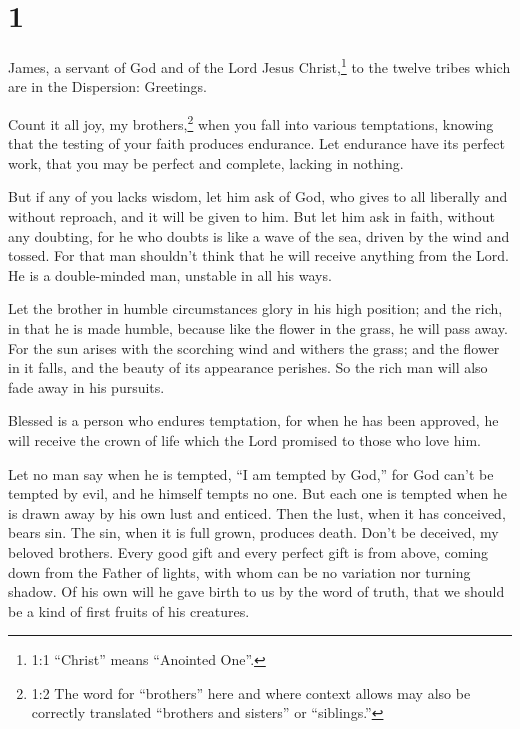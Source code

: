 \hypertarget{section}{%
\section{1}\label{section}}

 James, a servant of God and of the Lord Jesus
Christ,\footnote{1:1 ``Christ'' means ``Anointed One''.} to the twelve
tribes which are in the Dispersion: Greetings.

 Count it all joy, my brothers,\footnote{1:2 The word for
  ``brothers'' here and where context allows may also be correctly
  translated ``brothers and sisters'' or ``siblings.''} when you fall
into various temptations,  knowing that the testing of your
faith produces endurance.  Let endurance have its perfect
work, that you may be perfect and complete, lacking in nothing.

 But if any of you lacks wisdom, let him ask of God, who
gives to all liberally and without reproach, and it will be given to
him.  But let him ask in faith, without any doubting, for he
who doubts is like a wave of the sea, driven by the wind and tossed.
 For that man shouldn't think that he will receive anything
from the Lord.  He is a double-minded man, unstable in all
his ways.

 Let the brother in humble circumstances glory in his high
position;  and the rich, in that he is made humble, because
like the flower in the grass, he will pass away.  For the
sun arises with the scorching wind and withers the grass; and the flower
in it falls, and the beauty of its appearance perishes. So the rich man
will also fade away in his pursuits.

 Blessed is a person who endures temptation, for when he
has been approved, he will receive the crown of life which the Lord
promised to those who love him.

 Let no man say when he is tempted, ``I am tempted by
God,'' for God can't be tempted by evil, and he himself tempts no one.
 But each one is tempted when he is drawn away by his own
lust and enticed.  Then the lust, when it has conceived,
bears sin. The sin, when it is full grown, produces death. 
Don't be deceived, my beloved brothers.  Every good gift
and every perfect gift is from above, coming down from the Father of
lights, with whom can be no variation nor turning shadow. 
Of his own will he gave birth to us by the word of truth, that we should
be a kind of first fruits of his creatures.

